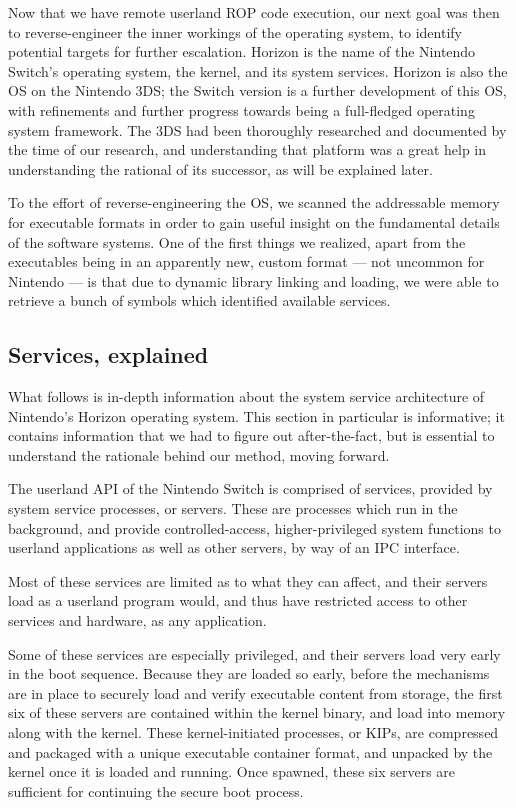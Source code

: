 \documentclass[journal]{IEEEtran}
\begin{document}
Now that we have remote userland ROP code execution, our next goal was then to reverse-engineer
the inner workings of the operating system, to identify potential targets for further escalation.
Horizon is the name of the Nintendo Switch's operating system, the kernel, and its system services. 
Horizon is also the OS on the Nintendo 3DS; the Switch version is a further development of this OS,
with refinements and further progress towards being a full-fledged operating system framework.
The 3DS had been thoroughly researched and documented by the time of our research, and
understanding that platform was a great help in understanding the rational of its successor, as
will be explained later.

To the effort of reverse-engineering the OS, we scanned the addressable memory for executable
formats in order to gain useful insight on the fundamental details of the software systems.
One of the first things we realized, apart from the executables being in an apparently new,
custom format --- not uncommon for Nintendo \cite{3ds_formats} --- is that due to dynamic library
linking and loading, we were able to retrieve a bunch of symbols which identified available
services.

\subsection{Services, explained}

What follows is in-depth information about the system service architecture of Nintendo's Horizon
operating system. 
This section in particular is informative; it contains information that we had
to figure out after-the-fact, but is essential to understand the rationale behind our method,
moving forward.

The userland API of the Nintendo Switch is comprised of services, provided by system service
processes, or servers. These are processes which run in the background, and provide
controlled-access, higher-privileged system functions to userland applications as well as other
servers, by way of an IPC interface.

Most of these services are limited as to what they can affect, and their servers load as a
userland program would, and thus have restricted access to other services and hardware, as any
application.

Some of these services are especially privileged, and their servers load very early in the boot
sequence. Because they are loaded so early, before the mechanisms are in place to securely load
and verify executable content from storage, the first six of these servers are contained within
the kernel binary, and load into memory along with the kernel. These kernel-initiated processes,
or KIPs, are compressed and packaged with a unique executable container format, and unpacked by
the kernel once it is loaded and running. Once spawned, these six servers are sufficient for
continuing the secure boot process.
\end{document}
